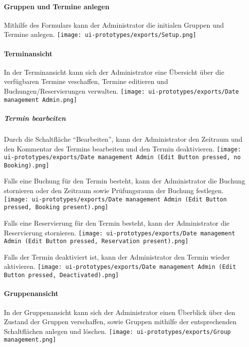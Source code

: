 \documentclass[]{article}
\let\oldparagraph\paragraph
\renewcommand{\paragraph}[1]{\oldparagraph{#1}\mbox{}}
\let\oldsubparagraph\subparagraph
\renewcommand{\subparagraph}[1]{\oldsubparagraph{#1}\mbox{}}
\begin{document}
\hypertarget{gruppen-und-termine-anlegen}{%
\paragraph{Gruppen und Termine
anlegen}\label{gruppen-und-termine-anlegen}}

Mithilfe des Formulars kann der Administrator die initialen Gruppen und
Termine anlegen. \texttt{[image: ui-prototypes/exports/Setup.png]}

\hypertarget{terminansicht-1}{%
\paragraph{Terminansicht}\label{terminansicht-1}}

In der Terminansicht kann sich der Administrator eine Übersicht über die
verfügbaren Termine veschaffen, Termine editieren und
Buchungen/Reservierungen verwalten.
\texttt{[image: ui-prototypes/exports/Date management Admin.png]}

\hypertarget{termin-bearbeiten}{%
\subparagraph{Termin bearbeiten}\label{termin-bearbeiten}}

Durch die Schaltfläche ``Bearbeiten'', kann der Administrator den
Zeitraum und den Kommentar des Termins bearbeiten und den Termin
deaktivieren.
\texttt{[image: ui-prototypes/exports/Date management Admin (Edit Button pressed, no Booking).png]}

Falls eine Buchung für den Termin besteht, kann der Administrator die
Buchung stornieren oder den Zeitraum sowie Prüfungsraum der Buchung
festlegen.
\texttt{[image: ui-prototypes/exports/Date management Admin (Edit Button pressed, Booking present).png]}

Falls eine Reservierung für den Termin besteht, kann der Administrator
die Reservierung stornieren.
\texttt{[image: ui-prototypes/exports/Date management Admin (Edit Button pressed, Reservation present).png]}

Falls der Termin deaktiviert ist, kann der Administrator den Termin
wieder aktivieren.
\texttt{[image: ui-prototypes/exports/Date management Admin (Edit Button pressed, Deactivated).png]}

\hypertarget{gruppenansicht}{%
\paragraph{Gruppenansicht}\label{gruppenansicht}}

In der Gruppenansicht kann sich der Administrator einen Überblick über
den Zustand der Gruppen verschaffen, sowie Gruppen mithilfe der
entsprechenden Schaltflächen anlegen und löschen.
\texttt{[image: ui-prototypes/exports/Group management.png]}
\end{document}
